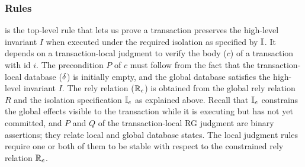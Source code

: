 \subsubsection{Rules}

 is the top-level rule that lets us prove a
transaction preserves the high-level invariant $I$ when executed under
the required isolation as specified by $\mathbb{I}$. It depends on a
transaction-local judgment to verify the body ($c$) of a transaction
with id $i$. The precondition $P$ of $c$ must follow from the fact
that the transaction-local database ($\delta$) is initially empty, and
the global database satisfies the high-level invariant $I$. The rely
relation ($\mathbb{R}_e$) is obtained from the global rely relation $R$ and
the isolation specification $\mathbb{I}_e$ as explained above. Recall that
$\mathbb{I}_e$ constrains the global effects visible to the transaction while
it is executing but has not yet committed, and $P$ and $Q$ of the
transaction-local RG judgment are binary assertions; they relate local
and global database states. The local judgment rules require one or
both of them to be stable with respect to the constrained rely
relation $\mathbb{R}_e$.






